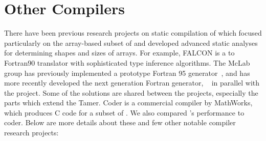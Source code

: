 \section{Other \matlab Compilers}
There have been  previous research projects on static compilation of
\matlab which focused particularly on the array-based subset of \matlab
and developed advanced static analyses for determining shapes and sizes
of arrays.  For example, FALCON \cite{falcon} is a \matlab to {\sc
Fortran90} translator with sophisticated type inference algorithms.
The McLab group has previously implemented a prototype Fortran 95
generator~\cite{McForThesis}, and has more recently developed the next generation
Fortran generator, \mctwofor~\cite{mc2for} in parallel with the \mixten project.   Some of the
solutions are shared between the projects, especially the parts which
extend the Tamer. \matlab Coder is a commercial compiler by MathWorks\cite{MATLABCoder},
which produces C code for a subset of \matlab. We also compared \mixten's
performance to \matlab coder. Below are more details about these and few other
notable \matlab compiler research projects:
